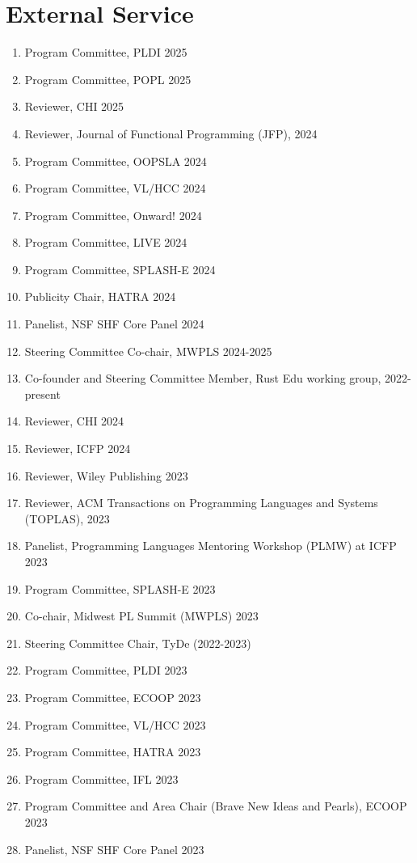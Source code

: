 \documentclass[10pt,letterpaper]{article}
\begin{document}
\section*{External Service}
\begin{enumerate}
  \item Program Committee, PLDI 2025
  \item Program Committee, POPL 2025
  \item Reviewer, CHI 2025
  \item Reviewer, Journal of Functional Programming (JFP), 2024
  \item Program Committee, OOPSLA 2024
  \item Program Committee, VL/HCC 2024
  \item Program Committee, Onward! 2024
  \item Program Committee, LIVE 2024
  \item Program Committee, SPLASH-E 2024
  \item Publicity Chair, HATRA 2024
  \item Panelist, NSF SHF Core Panel 2024
  \item Steering Committee Co-chair, MWPLS 2024-2025
  \item Co-founder and Steering Committee Member, Rust Edu working group, 2022-present
  \item Reviewer, CHI 2024
  \item Reviewer, ICFP 2024
  \item Reviewer, Wiley Publishing 2023
  \item Reviewer, ACM Transactions on Programming Languages and Systems (TOPLAS), 2023
  \item Panelist, Programming Languages Mentoring Workshop (PLMW) at ICFP 2023
  \item Program Committee, SPLASH-E 2023
  \item Co-chair, Midwest PL Summit (MWPLS) 2023
  \item Steering Committee Chair, TyDe (2022-2023)
  \item Program Committee, PLDI 2023
  \item Program Committee, ECOOP 2023
  \item Program Committee, VL/HCC 2023
  \item Program Committee, HATRA 2023
  \item Program Committee, IFL 2023
  \item Program Committee and Area Chair (Brave New Ideas and Pearls), ECOOP 2023
  \item Panelist, NSF SHF Core Panel 2023

\end{enumerate}
\end{document}
